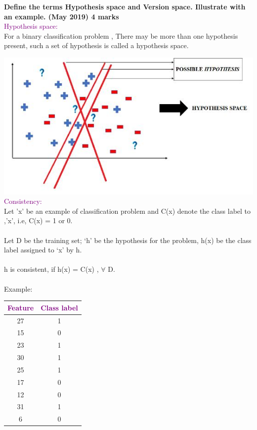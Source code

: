 
\textbf{\textcolor{LightMagenta}{Define the terms Hypothesis space and Version space. Illustrate with an 
example. (May 2019) \hfill 4 marks}}
\\[5pt]
{\textcolor{purple}{Hypothesis space:}}\\
For a binary classification problem , There may be more than one hypothesis present, such a set of hypothesis is called a hypothesis space.\\


\graphicspath{ {./} }
\includegraphics{Images/A23_img1.JPG}\\
{\textcolor{purple}{Consistency:}}\\
Let 'x' be an example of classification problem and C(x) denote the class label to ,'x', i.e, C(x) = 1 or 0.\\
\\
Let  D be the training set; ‘h’ be the hypothesis for the problem, h(x) be the class label assigned to ‘x’ by h.\\
\\
h is consistent, if h(x) = C(x) , $\forall$ D.\\
\\
Example:
\\


 \begin{table}[h]                           
 \centering
    \begin{tabular}{|c|c|}
    \hline
  \textcolor{purple}{Feature}   &    \textcolor{purple}{Class label}            \\ \hline
     27     &  1     \\ \hline          
     15     &  0 \\ \hline
     23     &  1   \\ \hline
     30     &  1    \\ \hline
     25     &  1  \\ \hline
     17     &  0   \\ \hline
     12     &  0 \\ \hline
     31     &  1     \\ \hline
     6      &  0   \\ \hline

    \end{tabular}
    \label{tab:msg1}                            

\end{table}\\

